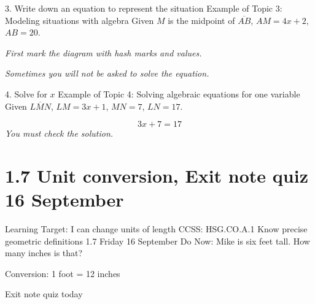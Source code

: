 \begin{frame}{3. Write down an equation to represent the situation}
  {Example of Topic 3: Modeling situations with algebra}
  Given $M$ is the midpoint of $\overline{AB}$, $AM=4x+2$, $AB=20$. \par  \vspace{0.5cm}
  \emph{First mark the diagram with hash marks and values.} \vspace{1cm}
    \begin{center}
    \end{center} \vspace{2cm}
  \emph{Sometimes you will not be asked to solve the equation.}
\end{frame}

\begin{frame}{4. Solve for $x$}
  {Example of Topic 4: Solving algebraic equations for one variable}
  Given $\overline{LMN}$, $LM=3x+1$, $MN=7$, $LN=17$.
    \begin{flushleft}
    \end{flushleft} \vspace{1cm}
  \large \[ 3x+7=17 \]  \vspace{1cm}
  \emph{You must check the solution.}
\end{frame}

\section{1.7 Unit conversion, Exit note quiz \hfill 16 September}
\begin{frame}{Learning Target: I can change units of length}
  {CCSS: HSG.CO.A.1 Know precise geometric definitions  \hfill \alert{1.7 Friday 16 September}}
  Do Now: Mike is six feet tall. How many inches is that? \par \medskip
  Conversion: 1 foot = 12 inches \par
  \vspace{3cm}
  \alert{Exit note quiz today}
\end{frame}

